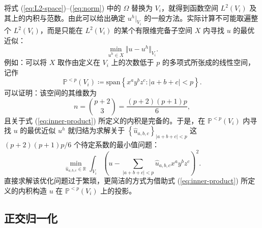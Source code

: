 将式 (\ref{eq:L2-space})–(\ref{eq:norm}) 中的 $\varOmega$ 替换为 $V_{i}$，就得到函数空间
$L^{2}(V_{i})$ 及其上的内积与范数。由此可以给出确定
$u^{h}|_{V_{i}}$ 的一般方法。实际计算不可能取遍整个 $L^{2}(V_{i})$，而是只能在 $L^{2}(V_{i})$
的某个有限维完备子空间 $X$ 内寻找 $u$ 的最优近似：
\begin{equation}
\min_{u^{h}\in X}\Vert u-u^{h}\Vert_{V_{i}}.
\end{equation}
例如：可以将 $X$ 取作由定义在 $V_{i}$ 上的次数低于 $p$ 的多项式所张成的线性空间，记作
\begin{equation}
\mathbb{P}^{<p}(V_{i})\coloneqq\mathrm{span}\left\{ x^{a}y^{b}z^{c}:\vert a+b+c\vert<p\right\} .
\end{equation}
可以证明：该空间的其维数为
\begin{equation}
n=\binom{p+2}{3}=\frac{(p+2)(p+1)p}{6},
\end{equation}
且关于式 (\ref{eq:inner-product}) 所定义的内积是完备的。于是，在 $\mathbb{P}^{<p}(V_{i})$
内寻找 $u$ 的最优近似 $u^{h}$ 就归结为求解关于 $\left\{ \hat{u}_{a,b,c}\right\} _{\vert a+b+c\vert<p}$
这 $(p+2)(p+1)p/6$ 个待定系数的最小值问题：
\begin{equation}
\min_{\hat{u}_{a,b,c}\in\mathbb{R}}\int_{V_{i}}\left(u-\sum_{\vert a+b+c\vert<p}\hat{u}_{a,b,c}x^{a}y^{b}z^{c}\right)^{2}.
\end{equation}
直接求解该优化问题过于繁琐，更简洁的方式为借助式 (\ref{eq:inner-product}) 所定义的内积构造 $u$ 在
$\mathbb{P}^{<p}(V_{i})$ 上的投影。

\subsection{正交归一化\label{subsec:orthonormal}}


